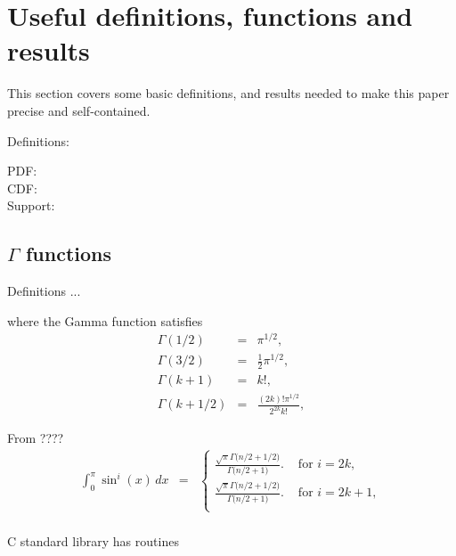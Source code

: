 \section{Useful definitions, functions and results}
\label{sec:useful}

This section covers some basic definitions, and results needed to make
this paper precise and self-contained.

Definitions:
\begin{description}

\item[PDF:] 

\item[CDF:]

\item[Support:]

\end{description}



\subsection{$\Gamma$ functions}

Definitions ...


where the Gamma function satisfies\cite[6.1.12]{Abramowitz_and_Stegun}
\begin{eqnarray}
 \label{eq:gamma}
 \Gamma(1/2) & = & \pi^{1/2}, \\
 \Gamma(3/2) & = & \frac{1}{2} \pi^{1/2}, \\
 \Gamma(k+1) & = & k!, \\
 \Gamma(k+1/2) & = & \frac{(2k)! \pi^{1/2}}{2^{2k} k!},
\end{eqnarray}



From ????
\begin{eqnarray}
  \int_0^{\pi} \sin^i(x) \, dx
    & = & \left\{ \begin{array}{ll}
        \displaystyle
      \frac{\sqrt{\pi} \Gamma\big( n/2 + 1/2 \big)}{\Gamma\big( n/2+1 \big)}.
      & \mbox{ for } i = 2k, \\
        \displaystyle
      \frac{\sqrt{\pi} \Gamma\big( n/2 + 1/2 \big)}{\Gamma\big( n/2+1 \big)}.
      & \mbox{ for } i = 2k+1, \\
           \end{array} \right. \nonumber \\
\end{eqnarray}



C standard library has routines

